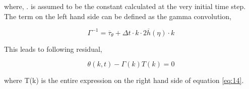 \documentclass[a4paper,11pt,dvipsnames]{article}
\begin{document}
where, . 
 is assumed to be the constant  calculated at the very initial time step. 
The term on the left hand side can be defined as the gamma convolution, 

\begin{equation}
    \Gamma^{-1} = \overline{\tau}_\theta + \Delta t \cdot k \cdot 2 \overline{h} (\eta) \cdot k \label{eq:15}
\end{equation}

This leads to following residual, 

\begin{equation}
    \theta (k,t) - \Gamma (k) T(k) = 0 \label{eq:16}
\end{equation}

where T(k) is the entire expression on the right hand side of equation \ref{eq:14}. 



\end{document}

